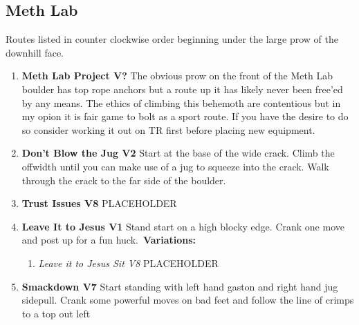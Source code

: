 \subsection*{Meth Lab}\label{bf:Meth Lab}
Routes listed in counter clockwise order beginning under the large prow of the downhill face.

\label{pt:Octurnal}
\begin{enumerate}[]
	\item\label{rt:Meth Lab Project} \colorbox{black!20}{\textbf{Meth Lab Project V?  \warn \warn \warn } }
	\newline The obvious prow on the front of the Meth Lab boulder has top rope anchors but a route up it has likely never been free'ed by any means. The ethics of climbing this behemoth are contentious but in my opion it is fair game to bolt as a sport route. If you have the desire to do so consider working it out on TR first before placing new equipment.\
	\item\label{rt:Don't Blow the Jug} \colorbox{green!20}{\textbf{Don't Blow the Jug V2  } }
	\newline Start at the base of the wide crack. Climb the offwidth until you can make use of a jug to squeeze into the crack. Walk through the crack to the far side of the boulder.\
	\item\label{rt:Trust Issues} \colorbox{Goldenrod!50}{\textbf{Trust Issues V8  \warn \warn } }
	\newline PLACEHOLDER\
	\item\label{rt:Leave It to Jesus} \colorbox{green!20}{\textbf{Leave It to Jesus V1 \ding{72} \ding{72}  } }
	\newline Stand start on a high blocky edge. Crank one move and post up for a fun huck.\
	\newline \textbf{Variations:}
	\begin{enumerate}
		\item\label{vr:Leave it to Jesus Sit} \colorbox{Goldenrod!50}{\emph{Leave it to Jesus Sit V8  }  }
		\newline PLACEHOLDER\
	\end{enumerate}
	\item\label{rt:Smackdown} \colorbox{Goldenrod!50}{\textbf{Smackdown V7    } }
	\newline Start standing with left hand gaston and right hand jug sidepull. Crank some powerful moves on bad feet and follow the line of crimps to a top out left\

\end{enumerate}
